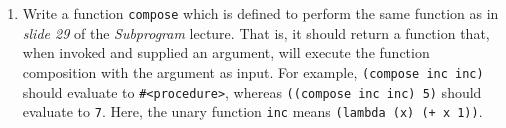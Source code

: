 \documentclass{exam}
\begin{document}
\begin{questions}
\begin{enumerate}
\item Write a function \verb|compose| which is defined to perform the same function as in \emph{slide 29} of the \emph{Subprogram} lecture. That is, it should return a function that, when invoked and supplied an argument, will
execute the function composition with the argument as input. For example, \verb|(compose inc inc)| should evaluate to \verb|#<procedure>|, whereas \verb|((compose inc inc) 5)| should evaluate to \verb|7|. Here, the unary function \verb|inc| means \verb|(lambda (x) (+ x 1))|.

\end{enumerate}


\end{questions}
\end{document}
